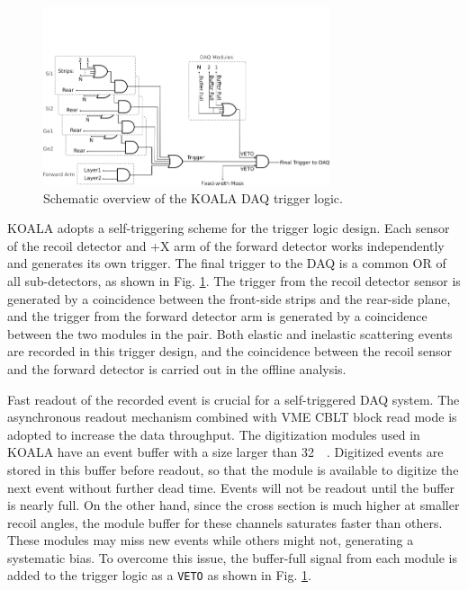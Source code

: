 \documentclass[number,5p]{elsarticle}
\begin{document}
\begin{figure}[tb!]
  \centering
  \includegraphics[width=0.75\textwidth]{./trigger_logic.png}
  \caption{Schematic overview of the KOALA DAQ trigger logic.}
  \label{fig:trigger_logic}
\end{figure}

KOALA adopts a self-triggering scheme for the trigger logic design.
Each sensor of the recoil detector and +X arm of the forward detector works independently and generates its own trigger. 
The final trigger to the DAQ is a common OR of all sub-detectors, as shown in Fig. \ref{fig:trigger_logic}.
The trigger from the recoil detector sensor is generated by a coincidence between the front-side strips and the rear-side plane, 
and the trigger from the forward detector arm is generated by a coincidence between the two modules in the pair.
Both elastic and inelastic scattering events are recorded in this trigger
design, and the coincidence between the recoil sensor and the forward detector
is carried out in the offline analysis.

Fast readout of the recorded event is crucial for a self-triggered DAQ system.
The asynchronous readout mechanism combined with VME CBLT block read mode is adopted to increase the data throughput.
The digitization modules used in KOALA have an event buffer with a size
larger than \SI{32}{\kibi\byte}.
Digitized events are stored in this buffer before readout, so that the module is
available to digitize the next event without further dead time.
Events will not be readout until the buffer is nearly full.
On the other hand, since the cross section is much higher at smaller recoil
angles, the module buffer for these channels saturates faster than others.
These modules may miss new events while others might not, generating a systematic bias.
To overcome this issue, the buffer-full signal from each module is added to the
trigger logic as a \texttt{VETO} as shown in Fig. \ref{fig:trigger_logic}.
\end{document}
